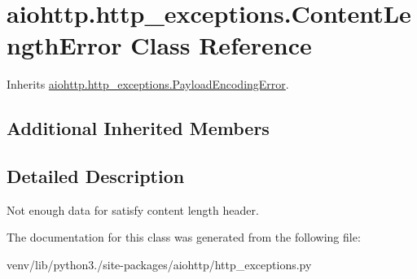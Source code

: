 \hypertarget{classaiohttp_1_1http__exceptions_1_1_content_length_error}{}\section{aiohttp.\+http\+\_\+exceptions.\+Content\+Length\+Error Class Reference}
\label{classaiohttp_1_1http__exceptions_1_1_content_length_error}


Inherits \hyperlink{classaiohttp_1_1http__exceptions_1_1_payload_encoding_error}{aiohttp.\+http\+\_\+exceptions.\+Payload\+Encoding\+Error}.

\subsection*{Additional Inherited Members}


\subsection{Detailed Description}
\begin{DoxyVerb}Not enough data for satisfy content length header.\end{DoxyVerb}
 

The documentation for this class was generated from the following file\+:\begin{DoxyCompactItemize}
\item 
venv/lib/python3./site-\/packages/aiohttp/http\+\_\+exceptions.\+py\end{DoxyCompactItemize}
